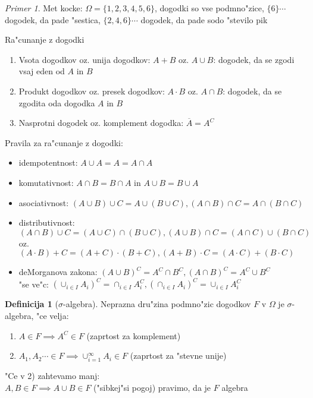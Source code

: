 \documentclass[a4paper,12pt]{article}
\theoremstyle{definition}
\newtheorem{defn}[counter]{Definicija}
\theoremstyle{remark}
\newtheorem*{ex}{Primer}
\begin{document}
\begin{ex}
    Met kocke: $\Omega = \{1,2,3,4,5,6\}$, dogodki so vse podmno"zice,  $\{6\} \cdots$ dogodek, da pade "sestica,
    $\{2,4,6\} \cdots$ dogodek, da pade sodo "stevilo pik
\end{ex}

Ra"cunanje z dogodki

\begin{enumerate}
    \item Vsota dogodkov oz. unija dogodkov: $A + B$ oz. $A \cup B$: dogodek, da se zgodi vsaj eden od $A$ in $B$
    \item Produkt dogodkov oz. presek dogodkov: $A \cdot B$ oz. $A \cap B$: dogodek, da se zgodita oda dogodka $A$ in $B$
    \item Nasprotni dogodek oz. komplement dogodka: $\overline{A} = A^C$
\end{enumerate}

Pravila za ra"cunanje z dogodki:

\begin{itemize}
    \item idempotentnost: $A \cup A = A = A \cap A$
    \item komutativnost: $A \cap B = B \cap A$ in $A \cup B = B \cup A$




    \item asociativnost: $(A \cup B) \cup C = A \cup (B \cup C), (A \cap B) \cap C = A \cap (B \cap C)$
    \item distributivnost: $(A \cap B) \cup C = (A \cup C) \cap (B \cup C), (A \cup B) \cap C = (A \cap C) \cup (B \cap C)$
        oz. $(A \cdot B) + C = (A + C) \cdot (B + C), (A + B) \cdot C = (A \cdot C) + (B \cdot C)$
    \item deMorganova zakona: $(A \cup B)^C = A^C \cap B^C, (A \cap B)^C = A^C \cup B^C$ \\
        "se ve"c: $(\cup_{i \in I} A_i)^C = \cap_{i \in I} A_i^C, (\cap_{i \in I} A_i)^C = \cup_{i \in I} A_i^C$
\end{itemize}

\begin{defn}[$\sigma$-algebra]
    Neprazna dru"zina podmno"zic dogodkov $F$ v $\Omega$ je $\sigma$-algebra, "ce velja:

    \begin{enumerate}
        \item $A \in F \implies A^C \in F$ (zaprtost za komplement)
        \item $A_1, A_2 \cdots \in F \implies \cup_{i=1}^{\infty} A_i \in F$ (zaprtost za "stevne unije)
    \end{enumerate}

    "Ce v 2) zahtevamo manj: \\
    $A, B \in F \implies A \cup B \in F$ ("sibkej"si pogoj) pravimo, da je $F$ algebra
\end{defn}
\end{document}

